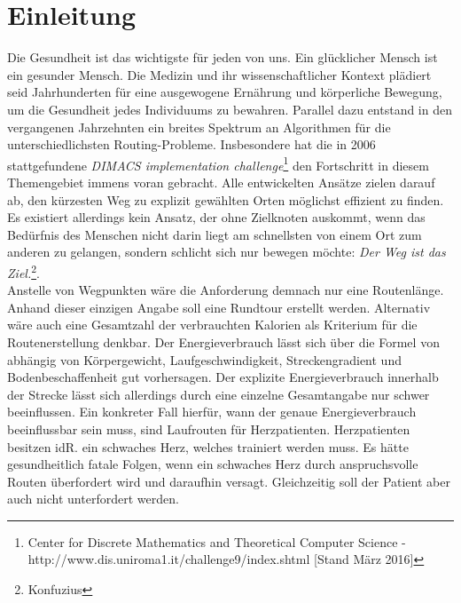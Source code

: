\documentclass[12pt]{article}
\begin{document}
\bigskip

\pagebreak

\tableofcontents

\pagebreak

\section{Einleitung}\label{opening}

Die Gesundheit ist das wichtigste für jeden von uns. Ein glücklicher Mensch ist ein gesunder Mensch. Die Medizin und ihr wissenschaftlicher Kontext plädiert seid Jahrhunderten für eine ausgewogene Ernährung und körperliche Bewegung, um die Gesundheit jedes Individuums zu bewahren. Parallel dazu entstand in den vergangenen Jahrzehnten ein breites Spektrum an Algorithmen für die unterschiedlichsten Routing-Probleme. Insbesondere hat die in 2006 stattgefundene \textit{DIMACS implementation challenge}\footnote{Center for Discrete Mathematics and Theoretical Computer Science - http://www.dis.uniroma1.it/challenge9/index.shtml [Stand März 2016]} den Fortschritt in diesem Themengebiet immens voran gebracht. Alle entwickelten Ansätze zielen darauf ab, den kürzesten Weg zu explizit gewählten Orten möglichst effizient zu finden. Es existiert allerdings kein Ansatz, der ohne Zielknoten auskommt, wenn das Bedürfnis des Menschen nicht darin liegt am schnellsten von einem Ort zum anderen zu gelangen, sondern schlicht sich nur bewegen möchte: \glqq \textit{Der Weg ist das Ziel.}\grqq \footnote{Konfuzius}. \\
Anstelle von Wegpunkten wäre die Anforderung demnach nur eine Routenlänge. Anhand dieser einzigen Angabe soll eine Rundtour erstellt werden. Alternativ wäre auch eine Gesamtzahl der verbrauchten Kalorien als Kriterium für die Routenerstellung denkbar. Der Energieverbrauch lässt sich über die Formel von \cite{givoni1971} abhängig von Körpergewicht, Laufgeschwindigkeit, Streckengradient und Bodenbeschaffenheit gut vorhersagen. Der explizite Energieverbrauch innerhalb der Strecke lässt sich allerdings durch eine einzelne Gesamtangabe nur schwer beeinflussen. Ein konkreter Fall hierfür, wann der genaue Energieverbrauch beeinflussbar sein muss, sind Laufrouten für Herzpatienten. Herzpatienten besitzen idR. ein schwaches Herz, welches trainiert werden muss. Es hätte gesundheitlich fatale Folgen, wenn ein schwaches Herz durch anspruchsvolle Routen überfordert wird und daraufhin versagt. Gleichzeitig soll der Patient aber auch nicht unterfordert werden.\\ 
\end{document}
